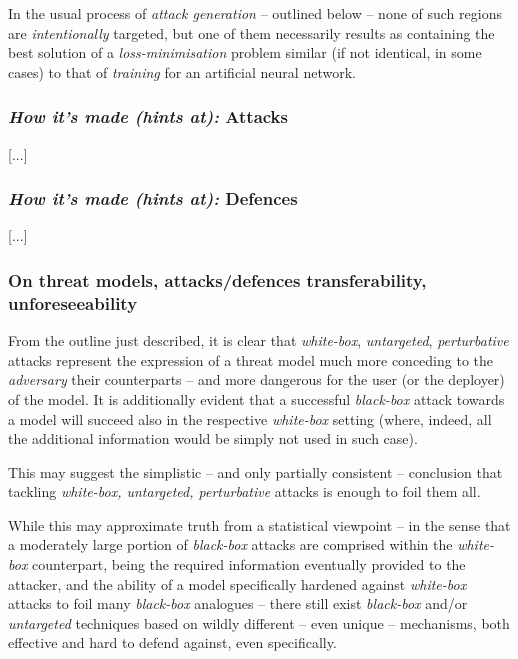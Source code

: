 In the usual process of \textit{attack generation} -- outlined below -- none of such regions are \textit{intentionally} targeted, but one of them necessarily results as containing the best solution of a \textit{loss-minimisation} problem similar (if not identical, in some cases) to that of \textit{training} for an artificial neural network.

\subsubsection{\textit{How it's made (hints at):} Attacks}
[...]
\subsubsection{\textit{How it's made (hints at):} Defences}
[...]

\subsubsection{On threat models, attacks/defences transferability, unforeseeability}
From the outline just described, it is clear that \textit{white-box}, \textit{untargeted}, \textit{perturbative} attacks represent the expression of a threat model much more conceding to the \textit{adversary} \wrt their counterparts -- and more dangerous for the user (or the deployer) of the model.
It is additionally evident that a successful \textit{black-box} attack towards a model will succeed also in the respective \textit{white-box} setting (where, indeed, all the additional information would be simply not used in such case).

This may suggest the simplistic -- and only partially consistent -- conclusion that tackling \textit{white-box, untargeted, perturbative} attacks is enough to foil them all.

While this may approximate truth from a statistical viewpoint -- in the sense that a moderately large portion of \textit{black-box} attacks are comprised within the \textit{white-box} counterpart, being the required information eventually provided to the attacker, and the ability of a model specifically hardened against \textit{white-box} attacks to foil many \textit{black-box} analogues -- there still exist \textit{black-box} and/or \textit{untargeted} techniques based on wildly different -- even unique -- mechanisms, both effective and hard to defend against, even specifically.

